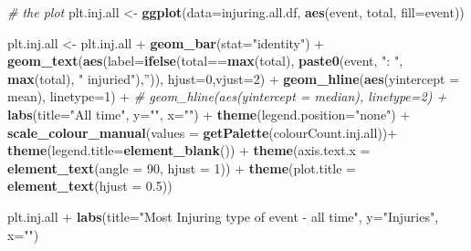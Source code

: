 \documentclass[]{article}
\newenvironment{Shaded}{\begin{snugshade}}{\end{snugshade}}
\newcommand{\KeywordTok}[1]{\textcolor[rgb]{0.13,0.29,0.53}{\textbf{{#1}}}}
\newcommand{\DataTypeTok}[1]{\textcolor[rgb]{0.13,0.29,0.53}{{#1}}}
\newcommand{\DecValTok}[1]{\textcolor[rgb]{0.00,0.00,0.81}{{#1}}}
\newcommand{\FloatTok}[1]{\textcolor[rgb]{0.00,0.00,0.81}{{#1}}}
\newcommand{\StringTok}[1]{\textcolor[rgb]{0.31,0.60,0.02}{{#1}}}
\newcommand{\CommentTok}[1]{\textcolor[rgb]{0.56,0.35,0.01}{\textit{{#1}}}}
\newcommand{\NormalTok}[1]{{#1}}
\begin{document}
\begin{Shaded}
\begin{Highlighting}[]
\CommentTok{# the plot}
\NormalTok{plt.inj.all <-}\StringTok{ }\KeywordTok{ggplot}\NormalTok{(}\DataTypeTok{data=}\NormalTok{injuring.all.df, }\KeywordTok{aes}\NormalTok{(event, total, }\DataTypeTok{fill=}\NormalTok{event))}

\NormalTok{plt.inj.all <-}\StringTok{ }\NormalTok{plt.inj.all +}\StringTok{ }\KeywordTok{geom_bar}\NormalTok{(}\DataTypeTok{stat=}\StringTok{"identity"}\NormalTok{) +}
\StringTok{        }\KeywordTok{geom_text}\NormalTok{(}\KeywordTok{aes}\NormalTok{(}\DataTypeTok{label=}\KeywordTok{ifelse}\NormalTok{(total==}\KeywordTok{max}\NormalTok{(total),}
                \KeywordTok{paste0}\NormalTok{(event, }\StringTok{": "}\NormalTok{, }\KeywordTok{max}\NormalTok{(total), }\StringTok{" injuried"}\NormalTok{),}\StringTok{''}\NormalTok{)),}
                \DataTypeTok{hjust=}\DecValTok{0}\NormalTok{,}\DataTypeTok{vjust=}\DecValTok{2}\NormalTok{) +}
\StringTok{        }\KeywordTok{geom_hline}\NormalTok{(}\KeywordTok{aes}\NormalTok{(}\DataTypeTok{yintercept =} \NormalTok{mean), }\DataTypeTok{linetype=}\DecValTok{1}\NormalTok{) +}
\StringTok{        }\CommentTok{# geom_hline(aes(yintercept = median), linetype=2) +}
\StringTok{        }\KeywordTok{labs}\NormalTok{(}\DataTypeTok{title=}\StringTok{"All time"}\NormalTok{, }
             \DataTypeTok{y=}\StringTok{""}\NormalTok{, }\DataTypeTok{x=}\StringTok{""}\NormalTok{) +}\StringTok{ }
\StringTok{                }
\StringTok{        }\KeywordTok{theme}\NormalTok{(}\DataTypeTok{legend.position=}\StringTok{"none"}\NormalTok{) +}\StringTok{        }
\StringTok{        }\KeywordTok{scale_colour_manual}\NormalTok{(}\DataTypeTok{values =} \KeywordTok{getPalette}\NormalTok{(colourCount.inj.all))+}\StringTok{                }
\StringTok{        }\KeywordTok{theme}\NormalTok{(}\DataTypeTok{legend.title=}\KeywordTok{element_blank}\NormalTok{()) +}
\StringTok{        }\KeywordTok{theme}\NormalTok{(}\DataTypeTok{axis.text.x =} \KeywordTok{element_text}\NormalTok{(}\DataTypeTok{angle =} \DecValTok{90}\NormalTok{, }\DataTypeTok{hjust =} \DecValTok{1}\NormalTok{)) +}\StringTok{ }
\StringTok{        }\KeywordTok{theme}\NormalTok{(}\DataTypeTok{plot.title =} \KeywordTok{element_text}\NormalTok{(}\DataTypeTok{hjust =} \FloatTok{0.5}\NormalTok{))                 }
                

\NormalTok{plt.inj.all  +}\StringTok{ }\KeywordTok{labs}\NormalTok{(}\DataTypeTok{title=}\StringTok{"Most Injuring type of event - all time"}\NormalTok{,}
                    \DataTypeTok{y=}\StringTok{"Injuries"}\NormalTok{, }\DataTypeTok{x=}\StringTok{""}\NormalTok{)}
\end{Highlighting}
\end{Shaded}
\end{document}

